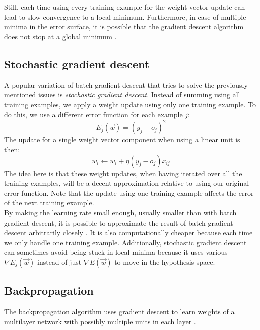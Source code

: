 Still, each time using every training example for the weight vector update can lead to slow convergence to a local minimum.
Furthermore, in case of multiple minima in the error surface, it is possible that the gradient descent algorithm does not stop at a global minimum \parencite{ML}.

\subsection{Stochastic gradient descent} %
\label{ssub:stochastic_gradient_descent}
A popular variation of batch gradient descent that tries to solve the previously mentioned issues is \textit{stochastic gradient descent}.
Instead of summing using all training examples, we apply a weight update using only one training example.
To do this, we use a different error function for each example $j$:
\begin{equation}
    E_j(\overrightarrow{w}) = (y_j - o_j)^2
\end{equation}
The update for a single weight vector component when using a linear unit is then:
\begin{equation}
    w_i \gets w_i + \eta(y_j- o_j)x_{ij}
\end{equation}
The idea here is that these weight updates, when having iterated over all the training examples, will be a decent approximation relative to using our original error function.
Note that the update using one training example affects the error of the next training example.\\

By making the learning rate small enough, usually smaller than with batch gradient descent, it is possible to approximate the result of batch gradient descent arbitrarily closely \parencite{ML}.
It is also computationally cheaper because each time we only handle one training example.
Additionally, stochastic gradient descent can sometimes avoid being stuck in local minima because it uses various $\nabla E_j(\overrightarrow{w})$ instead of just $\nabla E(\overrightarrow{w})$ to move in the hypothesis space.

\subsection{Backpropagation} %
\label{ssub:backpropagation}
The backpropagation algorithm uses gradient descent to learn weights of a multilayer network with possibly multiple units in each layer \parencite{rumelhart1986learning}.

